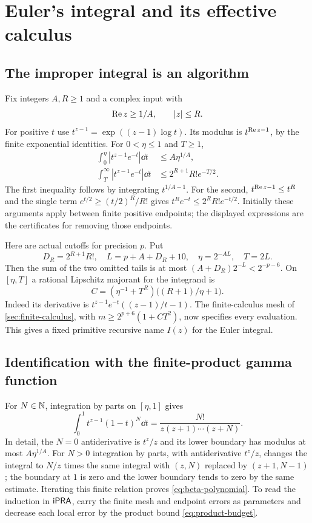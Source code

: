 \section{Euler's integral and its effective calculus}
\label{sec:integrals}

\subsection{The improper integral is an algorithm}

Fix integers $A,R\ge1$ and a complex input with
\[
 \operatorname{Re} z\ge1/A,
 \qquad |z|\le R.
\]
For positive $t$ use $t^{z-1}=\exp((z-1)\log t)$. Its modulus is
$t^{\operatorname{Re} z-1}$, by the finite exponential identities. For
$0<\eta\le1$ and $T\ge1$,
\begin{align}
 \int_0^\eta |t^{z-1}e^{-t}|\dd t
   &\le A\eta^{1/A},\label{eq:gamma-low-tail}\\
 \int_T^\infty |t^{z-1}e^{-t}|\dd t
   &\le 2^{R+1}R!e^{-T/2}.\label{eq:gamma-high-tail}
\end{align}
The first inequality follows by integrating $t^{1/A-1}$. For the
second, $t^{\operatorname{Re} z-1}\le t^R$ and the single term
$e^{t/2}\ge(t/2)^R/R!$ gives
$t^Re^{-t}\le2^RR!e^{-t/2}$. Initially these arguments apply between
finite positive endpoints; the displayed expressions are the certificates
for removing those endpoints.

Here are actual cutoffs for precision $p$. Put
\[
 D_R=2^{R+1}R!,\quad
 L=p+A+D_R+10,\quad
 \eta=2^{-AL},\quad T=2L.
\]
Then the sum of the two omitted tails is at most
$(A+D_R)2^{-L}<2^{-p-6}$. On $[\eta,T]$ a rational Lipschitz
majorant for the integrand is
\[
 C=(\eta^{-1}+T^R)\bigl((R+1)/\eta+1\bigr).
\]
Indeed its derivative is
$t^{z-1}e^{-t}((z-1)/t-1)$. The finite-calculus mesh of
\cref{sec:finite-calculus}, with $m\ge2^{p+6}(1+CT^2)$,
now specifies every evaluation. This gives a fixed primitive recursive
name $I(z)$ for the Euler integral.

\subsection{Identification with the finite-product gamma function}

For $N\in\mathbb N$, integration by parts on $[\eta,1]$ gives
\begin{equation}
 \int_0^1t^{z-1}(1-t)^N\dd t
 =\frac{N!}{z(z+1)\cdots(z+N)}.\label{eq:beta-polynomial}
\end{equation}
In detail, the $N=0$ antiderivative is $t^z/z$ and its lower boundary
has modulus at most $A\eta^{1/A}$. For $N>0$ integration by parts,
with antiderivative $t^z/z$, changes the integral to
$N/z$ times the same integral with $(z,N)$ replaced by $(z+1,N-1)$;
the boundary at $1$ is zero and the lower boundary tends to zero by
the same estimate. Iterating this finite relation proves
\eqref{eq:beta-polynomial}. To read the induction in $\mathsf{iPRA}$, carry
the finite mesh and endpoint errors as parameters and decrease each
local error by the product bound \eqref{eq:product-budget}.

